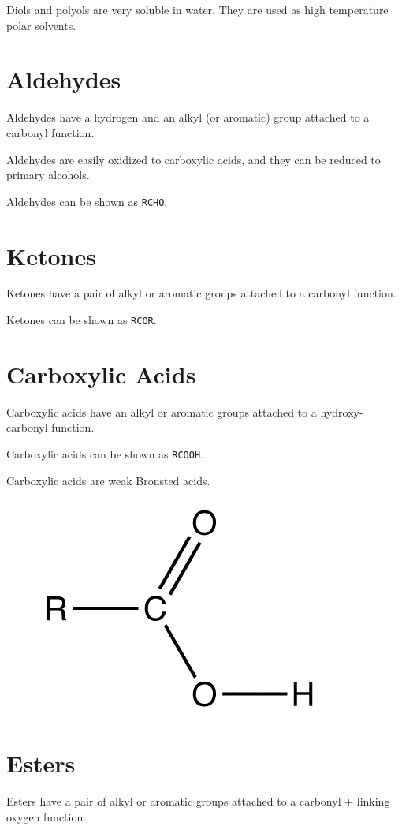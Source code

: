 \documentclass[oneside]{book}
\begin{document}
Diols and polyols are very soluble in water. They are used as high temperature
polar solvents.

\section{Aldehydes}
Aldehydes have a hydrogen and an alkyl (or aromatic) group attached to a
carbonyl function.

Aldehydes are easily oxidized to carboxylic acids, and they can be reduced to
primary alcohols.

Aldehydes can be shown as \texttt{RCHO}.

\section{Ketones}
Ketones have a pair of alkyl or aromatic groups attached to a carbonyl function.

Ketones can be shown as \texttt{RCOR}.

\section{Carboxylic Acids}
Carboxylic acids have an alkyl or aromatic groups attached to a hydroxy-carbonyl
function.

Carboxylic acids can be shown as \texttt{RCOOH}.

Carboxylic acids are weak Bronsted acids.

\begin{figure}[ht]
\includegraphics{carboxylic_acid.png}
\centering
\end{figure}

\section{Esters}
Esters have a pair of alkyl or aromatic groups attached to a carbonyl + linking
oxygen function.
\end{document}
